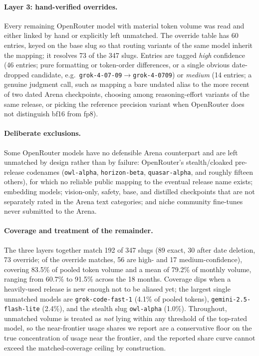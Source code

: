 \paragraph{Layer 3: hand-verified overrides.} Every remaining OpenRouter model
with material token volume was read and either linked by hand or explicitly left
unmatched. The override table has 60 entries, keyed on the base slug so that
routing variants of the same model inherit the mapping; it resolves 73 of the
347 slugs. Entries are tagged \emph{high} confidence (46 entries; pure formatting
or token-order differences, or a single obvious date-dropped candidate, e.g.\
\texttt{grok-4-07-09}$\to$\texttt{grok-4-0709}) or \emph{medium} (14 entries;
a genuine judgment call, such as mapping a bare undated alias to the more recent
of two dated Arena checkpoints, choosing among reasoning-effort variants of the
same release, or picking the reference precision variant when OpenRouter does
not distinguish bf16 from fp8).

\paragraph{Deliberate exclusions.} Some OpenRouter models have no defensible
Arena counterpart and are left unmatched by design rather than by failure:
OpenRouter's stealth/cloaked pre-release codenames (\texttt{owl-alpha},
\texttt{horizon-beta}, \texttt{quasar-alpha}, and roughly fifteen others), for
which no reliable public mapping to the eventual release name exists; embedding
models; vision-only, safety, base, and distilled checkpoints that are not
separately rated in the Arena text categories; and niche community fine-tunes
never submitted to the Arena.

\paragraph{Coverage and treatment of the remainder.} The three layers together
match 192 of 347 slugs (89 exact, 30 after date deletion, 73 override; of the
override matches, 56 are high- and 17 medium-confidence), covering 83.5\% of
pooled token volume and a mean of 79.2\% of monthly volume, ranging from 60.7\%
to 91.5\% across the 18 months. Coverage dips when a heavily-used release is new
enough not to be aliased yet; the largest single unmatched models are
\texttt{grok-code-fast-1} (4.1\% of pooled tokens),
\texttt{gemini-2.5-flash-lite} (2.4\%), and the stealth slug
\texttt{owl-alpha} (1.0\%). Throughout, unmatched volume is treated as
\emph{not} lying within any threshold of the top-rated model, so the
near-frontier usage shares we report are a conservative floor on the true
concentration of usage near the frontier, and the reported share curve cannot
exceed the matched-coverage ceiling by construction.

